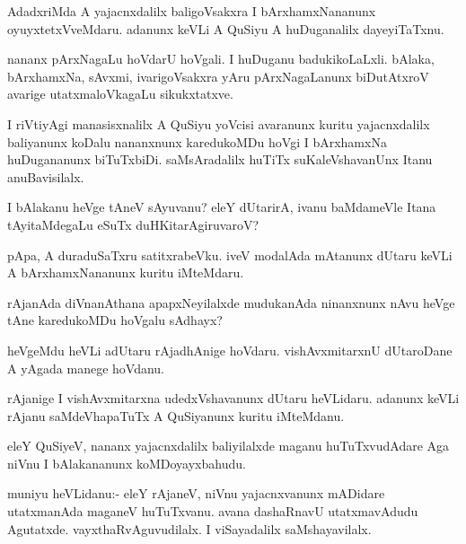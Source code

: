 \begin{mng}
AdadxriMda A yajacnxdalilx baligoVsakxra I bArxhamxNananunx oyuyxtetxVveMdaru. adanunx keVLi A QuSiyu A huDuganalilx dayeyiTaTxnu.
\end{mng}

\begin{mng}
nananx pArxNagaLu hoVdarU hoVgali. I huDuganu badukikoLaLxli. bAlaka, bArxhamxNa, sAvxmi, ivarigoVsakxra yAru pArxNagaLanunx biDutAtxroV avarige utatxmaloVkagaLu sikukxtatxve.
\end{mng}

\begin{mng}
I riVtiyAgi manasisxnalilx A QuSiyu yoVcisi avaranunx kuritu yajacnxdalilx baliyanunx koDalu nananxnunx karedukoMDu hoVgi I bArxhamxNa huDugananunx biTuTxbiDi. saMsAradalilx huTiTx suKaleVshavanUnx Itanu anuBavisilalx.
\end{mng}

\begin{mng}
I bAlakanu heVge tAneV sAyuvanu? eleY dUtarirA, ivanu baMdameVle Itana tAyitaMdegaLu eSuTx duHKitarAgiruvaroV?
\end{mng}

\begin{mng}
pApa, A duraduSaTxru satitxrabeVku. iveV modalAda mAtanunx dUtaru keVLi A bArxhamxNananunx kuritu iMteMdaru.
\end{mng}

\begin{mng}
rAjanAda diVnanAthana apapxNeyilalxde mudukanAda ninanxnunx nAvu heVge tAne karedukoMDu hoVgalu sAdhayx?
\end{mng}

\begin{mng}
heVgeMdu heVLi adUtaru rAjadhAnige hoVdaru. vishAvxmitarxnU dUtaroDane A yAgada manege hoVdanu.
\end{mng}

\begin{mng}
rAjanige I vishAvxmitarxna udedxVshavanunx dUtaru heVLidaru. adanunx keVLi rAjanu saMdeVhapaTuTx A QuSiyanunx kuritu iMteMdanu.
\end{mng}

\begin{mng}
eleY QuSiyeV, nananx yajacnxdalilx baliyilalxde maganu huTuTxvudAdare Aga niVnu I bAlakananunx koMDoyayxbahudu.
\end{mng}

\begin{mng}
muniyu heVLidanu:- eleY rAjaneV, niVnu yajacnxvanunx mADidare utatxmanAda maganeV huTuTxvanu. avana dashaRnavU utatxmavAdudu Agutatxde. vayxthaRvAguvudilalx. I viSayadalilx saMshayavilalx.
\end{mng}

